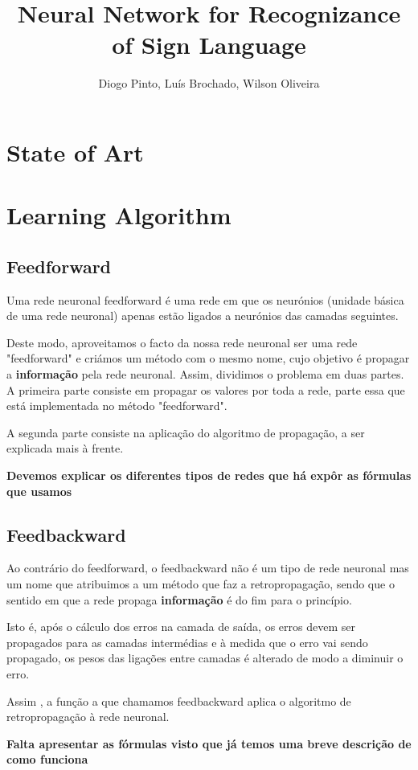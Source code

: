 \documentclass[10pt,a4paper]{article}
\author{Diogo Pinto, Luís Brochado, Wilson Oliveira}
\title{Neural Network for Recognizance of Sign Language}
\begin{document}
\maketitle

\section{State of Art}

\section{Learning Algorithm}

\subsection{Feedforward}
Uma rede neuronal feedforward é uma rede em que os neurónios (unidade básica de uma rede neuronal) apenas estão ligados a neurónios das camadas seguintes.

Deste modo, aproveitamos o facto da nossa rede neuronal ser uma rede "feedforward" e criámos um método com o mesmo nome, cujo objetivo é propagar a  \textbf{informação} pela rede neuronal.
Assim, dividimos o problema em duas partes.
A primeira parte consiste em propagar os valores por toda a rede, parte essa que está implementada no método "feedforward".

A segunda parte consiste na aplicação do algoritmo de propagação, a ser explicada mais à frente.

 \textbf{Devemos explicar os diferentes tipos de redes que há expôr as fórmulas que usamos}

\subsection{Feedbackward}
Ao contrário do feedforward, o feedbackward não é um tipo de rede neuronal mas um nome que atribuimos a um método que faz a retropropagação, sendo que o sentido em que a rede propaga \textbf{informação} é do fim para o princípio.

Isto é, após o cálculo dos erros na camada de saída, os erros devem ser propagados para as camadas intermédias e à medida que o erro vai sendo propagado, os pesos das ligações entre camadas é alterado de modo a diminuir o erro.

Assim , a função a que chamamos feedbackward aplica o algoritmo de retropropagação à rede neuronal.

 \textbf{Falta apresentar as fórmulas visto que já temos uma breve descrição de como funciona}
\end{document}
